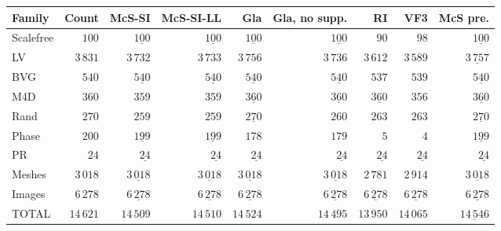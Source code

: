 
\begin{tabular}{lrrrrrrrr}
    \toprule
    Family & Count & McS-SI & McS-SI-LL & Gla & Gla, no supp. & RI & VF3 & McS pre.\\
    \midrule

\rule{0pt}{2.3ex}Scalefree & $100$ & $\underline{100}$ & $\underline{100}$ & $\underline{100}$ & $\underline{100}$ & $90$ & $98$ & $\underline{100}$\\
\rule{0pt}{2.3ex}LV & $3\,831$ & $3\,732$ & $3\,733$ & $3\,756$ & $3\,736$ & $3\,612$ & $3\,589$ & $\underline{3\,757}$\\
\rule{0pt}{2.3ex}BVG & $540$ & $\underline{540}$ & $\underline{540}$ & $\underline{540}$ & $\underline{540}$ & $537$ & $539$ & $\underline{540}$\\
\rule{0pt}{2.3ex}M4D & $360$ & $359$ & $359$ & $\underline{360}$ & $\underline{360}$ & $\underline{360}$ & $356$ & $\underline{360}$\\
\rule{0pt}{2.3ex}Rand & $270$ & $259$ & $259$ & $\underline{270}$ & $260$ & $263$ & $263$ & $\underline{270}$\\
\rule{0pt}{2.3ex}Phase & $200$ & $\underline{199}$ & $\underline{199}$ & $178$ & $179$ & $5$ & $4$ & $\underline{199}$\\
\rule{0pt}{2.3ex}PR & $24$ & $\underline{24}$ & $\underline{24}$ & $\underline{24}$ & $\underline{24}$ & $\underline{24}$ & $\underline{24}$ & $\underline{24}$\\
\rule{0pt}{2.3ex}Meshes & $3\,018$ & $\underline{3\,018}$ & $\underline{3\,018}$ & $\underline{3\,018}$ & $\underline{3\,018}$ & $2\,781$ & $2\,914$ & $\underline{3\,018}$\\
\rule{0pt}{2.3ex}Images & $6\,278$ & $\underline{6\,278}$ & $\underline{6\,278}$ & $\underline{6\,278}$ & $\underline{6\,278}$ & $\underline{6\,278}$ & $\underline{6\,278}$ & $\underline{6\,278}$\\
\midrule
\rule{0pt}{2.3ex}TOTAL & $14\,621$ & $14\,509$ & $14\,510$ & $14\,524$ & $14\,495$ & $13\,950$ & $14\,065$ & $\underline{14\,546}$\\

    \bottomrule
\end{tabular}

